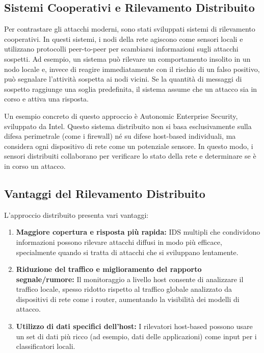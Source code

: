 \subsection{Sistemi Cooperativi e Rilevamento Distribuito}

Per contrastare gli attacchi moderni, sono stati sviluppati sistemi di rilevamento cooperativi. In questi sistemi, i nodi della rete agiscono come sensori locali e utilizzano protocolli peer-to-peer per scambiarsi informazioni sugli attacchi sospetti. Ad esempio, un sistema può rilevare un comportamento insolito in un nodo locale e, invece di reagire immediatamente con il rischio di un falso positivo, può segnalare l'attività sospetta ai nodi vicini. Se la quantità di messaggi di sospetto raggiunge una soglia predefinita, il sistema assume che un attacco sia in corso e attiva una risposta.

Un esempio concreto di questo approccio è Autonomic Enterprise Security, sviluppato da Intel. Questo sistema distribuito non si basa esclusivamente sulla difesa perimetrale (come i firewall) né su difese host-based individuali, ma considera ogni dispositivo di rete come un potenziale sensore. In questo modo, i sensori distribuiti collaborano per verificare lo stato della rete e determinare se è in corso un attacco.

\subsection{Vantaggi del Rilevamento Distribuito}

L'approccio distribuito presenta vari vantaggi:

\begin{enumerate}
    \item \textbf{Maggiore copertura e risposta più rapida:} IDS multipli che condividono informazioni possono rilevare attacchi diffusi in modo più efficace, specialmente quando si tratta di attacchi che si sviluppano lentamente.
    
    \item \textbf{Riduzione del traffico e miglioramento del rapporto segnale/rumore:} Il monitoraggio a livello host consente di analizzare il traffico locale, spesso ridotto rispetto al traffico globale analizzato da dispositivi di rete come i router, aumentando la visibilità dei modelli di attacco.
    
    \item \textbf{Utilizzo di dati specifici dell'host:} I rilevatori host-based possono usare un set di dati più ricco (ad esempio, dati delle applicazioni) come input per i classificatori locali.
\end{enumerate}

